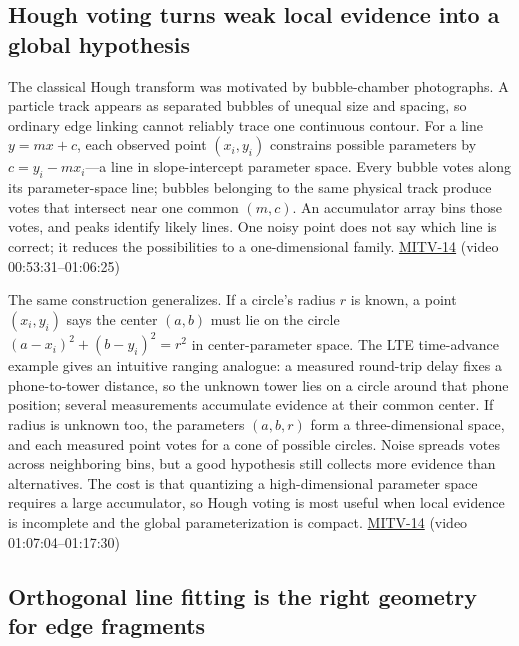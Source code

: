 \subsection{Hough voting turns weak local evidence into a global hypothesis}\label{04-visual-computing-ii-ch030-hough-voting-turns-weak-local-evidence-into-a-global-hypothesis}

The classical Hough transform was motivated by bubble-chamber photographs. A particle track appears as separated bubbles of unequal size and spacing, so ordinary edge linking cannot reliably trace one continuous contour. For a line \(y=mx+c\), each observed point \((x_i,y_i)\) constrains possible parameters by \(c=y_i-mx_i\)---a line in slope-intercept parameter space. Every bubble votes along its parameter-space line; bubbles belonging to the same physical track produce votes that intersect near one common \((m,c)\). An accumulator array bins those votes, and peaks identify likely lines. One noisy point does not say which line is correct; it reduces the possibilities to a one-dimensional family. \hyperref[04-visual-computing-ii-ch036-mitv-14---inspection-in-patquick-hough-transform-homography-position-determination-multi-scale]{MITV-14} (video 00:53:31--01:06:25)

The same construction generalizes. If a circle's radius \(r\) is known, a point \((x_i,y_i)\) says the center \((a,b)\) must lie on the circle \((a-x_i)^2+(b-y_i)^2=r^2\) in center-parameter space. The LTE time-advance example gives an intuitive ranging analogue: a measured round-trip delay fixes a phone-to-tower distance, so the unknown tower lies on a circle around that phone position; several measurements accumulate evidence at their common center. If radius is unknown too, the parameters \((a,b,r)\) form a three-dimensional space, and each measured point votes for a cone of possible circles. Noise spreads votes across neighboring bins, but a good hypothesis still collects more evidence than alternatives. The cost is that quantizing a high-dimensional parameter space requires a large accumulator, so Hough voting is most useful when local evidence is incomplete and the global parameterization is compact. \hyperref[04-visual-computing-ii-ch036-mitv-14---inspection-in-patquick-hough-transform-homography-position-determination-multi-scale]{MITV-14} (video 01:07:04--01:17:30)

\subsection{Orthogonal line fitting is the right geometry for edge fragments}\label{04-visual-computing-ii-ch030-orthogonal-line-fitting-is-the-right-geometry-for-edge-fragments}

